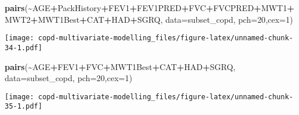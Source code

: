\documentclass[
]{article}
\newenvironment{Shaded}{\begin{snugshade}}{\end{snugshade}}
\newcommand{\AttributeTok}[1]{\textcolor[rgb]{0.13,0.29,0.53}{#1}}
\newcommand{\DecValTok}[1]{\textcolor[rgb]{0.00,0.00,0.81}{#1}}
\newcommand{\FunctionTok}[1]{\textcolor[rgb]{0.13,0.29,0.53}{\textbf{#1}}}
\newcommand{\NormalTok}[1]{#1}
\newcommand{\SpecialCharTok}[1]{\textcolor[rgb]{0.81,0.36,0.00}{\textbf{#1}}}
\begin{document}
\begin{Shaded}
\begin{Highlighting}[]
\FunctionTok{pairs}\NormalTok{(}\SpecialCharTok{\textasciitilde{}}\NormalTok{AGE}\SpecialCharTok{+}\NormalTok{PackHistory}\SpecialCharTok{+}\NormalTok{FEV1}\SpecialCharTok{+}\NormalTok{FEV1PRED}\SpecialCharTok{+}\NormalTok{FVC}\SpecialCharTok{+}\NormalTok{FVCPRED}\SpecialCharTok{+}\NormalTok{MWT1}\SpecialCharTok{+}\NormalTok{MWT2}\SpecialCharTok{+}\NormalTok{MWT1Best}\SpecialCharTok{+}\NormalTok{CAT}\SpecialCharTok{+}\NormalTok{HAD}\SpecialCharTok{+}\NormalTok{SGRQ, }\AttributeTok{data=}\NormalTok{subset\_copd, }\AttributeTok{pch=}\DecValTok{20}\NormalTok{,}\AttributeTok{cex=}\DecValTok{1}\NormalTok{)}
\end{Highlighting}
\end{Shaded}

\texttt{[image: copd-multivariate-modelling\_files/figure-latex/unnamed-chunk-34-1.pdf]}

\begin{Shaded}
\begin{Highlighting}[]
\FunctionTok{pairs}\NormalTok{(}\SpecialCharTok{\textasciitilde{}}\NormalTok{AGE}\SpecialCharTok{+}\NormalTok{FEV1}\SpecialCharTok{+}\NormalTok{FVC}\SpecialCharTok{+}\NormalTok{MWT1Best}\SpecialCharTok{+}\NormalTok{CAT}\SpecialCharTok{+}\NormalTok{HAD}\SpecialCharTok{+}\NormalTok{SGRQ, }\AttributeTok{data=}\NormalTok{subset\_copd, }\AttributeTok{pch=}\DecValTok{20}\NormalTok{,}\AttributeTok{cex=}\DecValTok{1}\NormalTok{)}
\end{Highlighting}
\end{Shaded}

\texttt{[image: copd-multivariate-modelling\_files/figure-latex/unnamed-chunk-35-1.pdf]}
\end{document}
